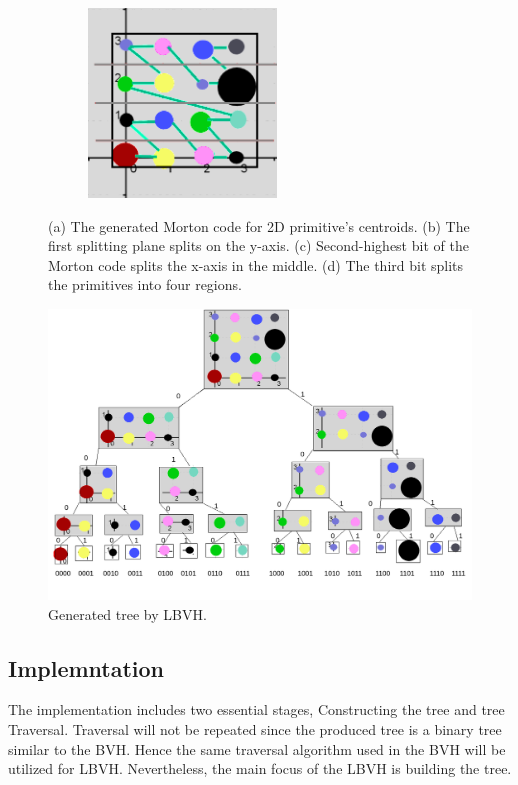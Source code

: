 \documentclass[11pt,a4paper]{article}
\begin{document}
\begin{figure}[H]
             \hfill
     \begin{subfigure}[b]{0.475\textwidth}
         \centering
         \captionsetup{justification=centering}
         \includegraphics[width=5cm]{images/example_lbvh/03_g.png}
         \caption{}
         \label{fig:pi_18000}
     \end{subfigure}
        \captionsetup{justification=centering,margin=2cm}

        \caption{(a) The generated Morton code for 2D primitive's centroids. (b) The first splitting plane splits on the y-axis. (c) Second-highest bit of the Morton code splits the x-axis in the middle. (d) The third bit splits the primitives into four regions. }
        \label{fig:mortonexample}
\end{figure}



\begin{figure}[h]	
     \centering
     \captionsetup{justification=centering,margin=2cm}
     \includegraphics[width=12cm]{images/example_lbvh/tree.png}
     \caption{Generated tree by LBVH.}
     \label{fig:dice}
\end{figure}


\subsection{Implemntation}
The implementation includes two essential stages, Constructing the tree and tree Traversal. Traversal will not be repeated since the produced tree is a binary tree similar to the BVH. Hence the same traversal algorithm used in the BVH will be utilized for LBVH. Nevertheless, the main focus of the LBVH is building the tree.
\end{document}
